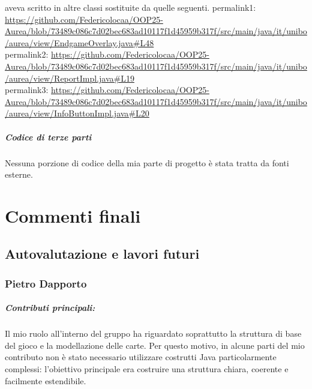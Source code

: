 \documentclass[11pt, a4paper, oneside]{report}
\begin{document}
\begin{itemize}
    aveva scritto in altre classi sostituite da quelle seguenti.
    permalink1: \url{https://github.com/Federicolocaa/OOP25-Aurea/blob/73489c086c7d02bec683ad10117f1d45959b317f/src/main/java/it/unibo/aurea/view/EndgameOverlay.java#L48} \\
    permalink2: \url{https://github.com/Federicolocaa/OOP25-Aurea/blob/73489c086c7d02bec683ad10117f1d45959b317f/src/main/java/it/unibo/aurea/view/ReportImpl.java#L19} \\
    permalink3: \url{https://github.com/Federicolocaa/OOP25-Aurea/blob/73489c086c7d02bec683ad10117f1d45959b317f/src/main/java/it/unibo/aurea/view/InfoButtonImpl.java#L20}
\end{itemize}

\paragraph{Codice di terze parti}
Nessuna porzione di codice della mia parte di progetto \`e stata tratta da
fonti esterne.

\chapter{Commenti finali}

\section{Autovalutazione e lavori futuri}

\subsection{Pietro Dapporto}
\paragraph{Contributi principali:}
Il mio ruolo all'interno del gruppo ha riguardato soprattutto la struttura di base del gioco 
e la modellazione delle carte. Per questo motivo, in alcune parti del mio contributo non è 
stato necessario utilizzare costrutti Java particolarmente complessi: l'obiettivo principale 
era costruire una struttura chiara, coerente e facilmente estendibile.
\end{document}
